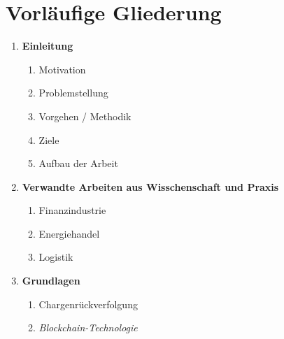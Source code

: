\section{Vorläufige Gliederung}
\begin{small}
  \begin{enumerate}
    \item \textbf{Einleitung}
    \begin{enumerate}[label*=\arabic*.]
      \item Motivation
      \item Problemstellung
      \item Vorgehen / Methodik
      \item Ziele
      \item Aufbau der Arbeit
    \end{enumerate}
    \item \textbf{Verwandte Arbeiten aus Wisschenschaft und Praxis}
    \begin{enumerate}[label*=\arabic*.]
      \item Finanzindustrie
      \item Energiehandel
      \item Logistik
    \end{enumerate}
    \item \textbf{Grundlagen}
    \begin{enumerate}[label*=\arabic*.]
      \item Chargenrückverfolgung
      \item \textit{Blockchain-Technologie}

\end{enumerate}
\end{enumerate}
\end{small}
